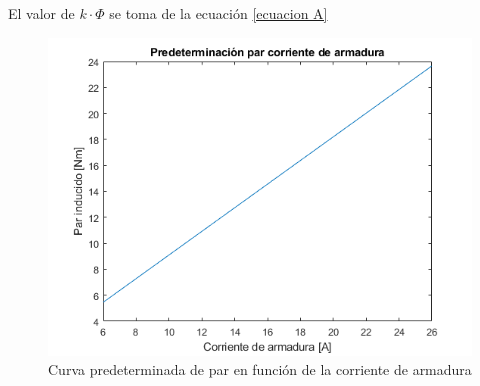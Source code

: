 \documentclass[11pt,letterpaper]{article}     %
\begin{document}
	El valor de $k\cdot \Phi$ se toma de la ecuación \ref{ecuacion A} 
	\begin{figure}[H]
	\centering
	\includegraphics[scale=0.8]{./recursos-Lab6/curvaPredeterminarParCorrienteArmadura.png}
	\caption{Curva predeterminada de par en función de la corriente de armadura}
	\label{fig:CurvaPredeterminarDeParCorriente}
\end{figure}
\end{document}
